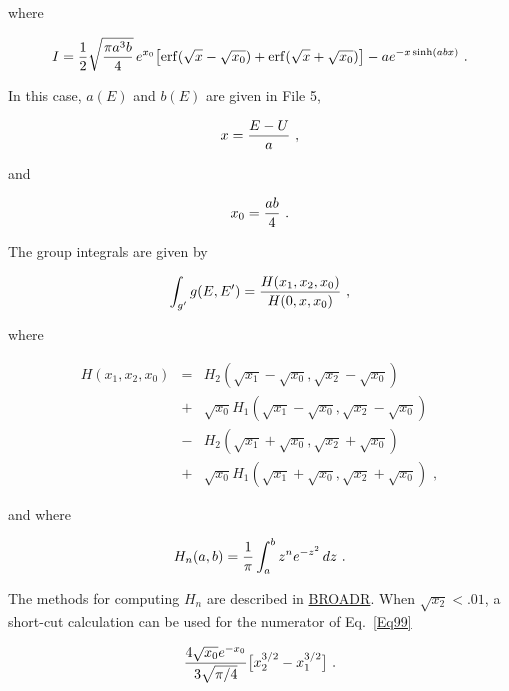 \noindent
where

  \begin{equation}
    I={1\over 2} \sqrt{{{\pi a^3 b}\over 4}}
    \,e^{x_0} \bigl[ {\rm erf}(\sqrt{x}-\sqrt{x_0})
    +{\rm erf}(\sqrt{x}+\sqrt{x_0}) \bigr]
    -a e^{-x\sinh(abx)}\,\,.
  \end{equation}

\noindent
In this case, $a(E)$ and $b(E)$ are given in File 5,

  \begin{equation}
    x={{E-U}\over a}\,\,,
  \end{equation}
\vspace{0.5 pt}

\noindent
and

  \begin{equation}
    x_0={{ab}\over 4}\,\,.
  \end{equation}
\vspace{0.5 pt}

\noindent
The group integrals are given by

  \begin{equation}
    \int_{g'}g(E,E')={{H(x_1,x_2,x_0)}\over{H(0,x,x_0)}}\,\,,
  \label{Eq99}
  \end{equation}
\vspace{0.5 pt}

\noindent
where

  \begin{eqnarray}
    H(x_1,x_2,x_0)&=&H_2(\sqrt{x_1}-\sqrt{x_0},\sqrt{x_2}-\sqrt{x_0})\nonumber\\
    &+&\sqrt{x_0}H_1(\sqrt{x_1}-\sqrt{x_0},\sqrt{x_2}-\sqrt{x_0})\nonumber\\
    &-&H_2(\sqrt{x_1}+\sqrt{x_0},\sqrt{x_2}+\sqrt{x_0})\nonumber\\
    &+&\sqrt{x_0}H_1(\sqrt{x_1}+\sqrt{x_0},\sqrt{x_2}+\sqrt{x_0})\,\,,
  \end{eqnarray}

\noindent
and where

  \begin{equation}
    H_n(a,b)={1\over\pi}\int_a^b z^n e^{-z^2}\,dz\,\,.
  \end{equation}
\vspace{0.5 pt}

\noindent
The methods for computing $H_n$ are described in
\hyperlink{sBROADRhy}{BROADR}.  When $\sqrt{x_2}<.01$, a
short-cut calculation can be used
for the numerator of Eq.~\ref{Eq99}

  \begin{equation}
    {{4\sqrt{x_0}e^{-x_0}}\over{3\sqrt{\pi /4}}}
    \bigl[ x_2^{3/2}-x_1^{3/2} \bigr]\,\,.
  \end{equation}
\vspace{0.5 pt}

